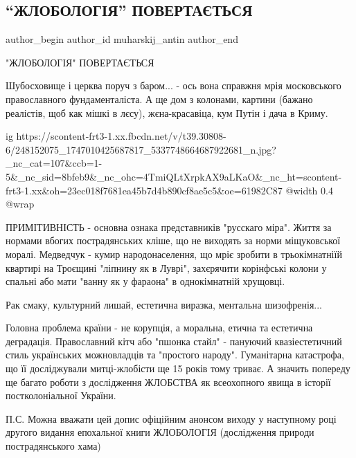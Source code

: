  
 
 
 
 
 
\subsection{\enquote{ЖЛОБОЛОГІЯ} ПОВЕРТАЄТЬСЯ}
\label{sec:12_11_2021.fb.muharskij_antin.1.zhlobologia_vozvraschaetsja}
 
\ifcmt
 author_begin
   author_id muharskij_antin
 author_end
\fi

"ЖЛОБОЛОГІЯ" ПОВЕРТАЄТЬСЯ

Шубосховище і церква поруч з баром... - ось вона справжня мрія московського
православного фундаменталіста.  А ще дом з колонами, картини  (бажано
реалістів, щоб как мішкі в лєсу), жєна-красавіца, кум Путін і дача в Криму. 

\ifcmt
  ig https://scontent-frt3-1.xx.fbcdn.net/v/t39.30808-6/248152075_1747010425687817_5337748664687922681_n.jpg?_nc_cat=107&ccb=1-5&_nc_sid=8bfeb9&_nc_ohc=4TmiQLtXrpkAX9aLKaO&_nc_ht=scontent-frt3-1.xx&oh=23ec018f7681ea45b7d4b890cf8ae5c5&oe=61982C87
  @width 0.4
  @wrap 
\fi

ПРИМІТИВНІСТЬ - основна ознака представників "русскаго міра". Життя за нормами
вбогих пострадянських кліше, що не виходять за норми міщуковської моралі.
Медведчук - кумир народонаселення, що мріє  зробити в трьокімнатніїй квартирі
на Троєщині "ліпнину як в Луврі",  захєрячити корінфські колони у спальні або
мати  "ванну як у фараона" в однокімнатній хрущовці.

Рак смаку, культурний лишай, естетична виразка, ментальна шизофренія...

Головна проблема країни - не корупція, а моральна, етична та естетична
деградація. Православний кітч або "пшонка стайл" - пануючий квазіестетичний
стиль українських можновладців та "простого народу". Гуманітарна катастрофа, що
її  досліджували митці-жлобісти ще 15 років тому триває. А значить попереду  ще
багато роботи з дослідження ЖЛОБСТВА як всеохопного явища в історії
постколоніальної України.

П.С. Можна вважати цей допис офіційним анонсом виходу у наступному році другого
видання епохальної книги ЖЛОБОЛОГІЯ (дослідження природи пострадянського хама)
